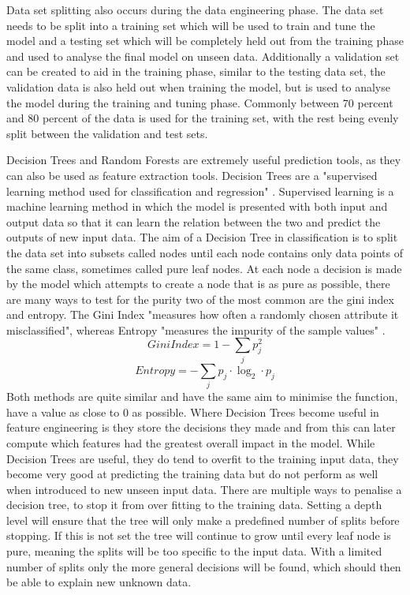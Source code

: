 \documentclass{imc-inf}
\begin{document}
	Data set splitting also occurs during the data engineering phase. The data set needs to be split into a training set which will be used to train and tune the model and a testing set which will be completely held out from the training phase and used to analyse the final model on unseen data. Additionally a validation set can be created to aid in the training phase, similar to the testing data set, the validation data is also held out when training the model, but is used to analyse the model during the training and tuning phase. Commonly between 70 percent and 80 percent of the data is used for the training set, with the rest being evenly split between the validation and test sets. 
	
	Decision Trees and Random Forests are extremely useful prediction tools, as they can also be used as feature extraction tools. Decision Trees are a "supervised learning method used for classification and regression" \cite{website:SciKitTrees}. Supervised learning is a machine learning method in which the model is presented with both input and output data so that it can learn the relation between the two and predict the outputs of new input data. The aim of a Decision Tree in classification is to split the data set into subsets called nodes until each node contains only data points of the same class, sometimes called pure leaf nodes. At each node a decision is made by the model which attempts to create a node that is as pure as possible, there are many ways to test for the purity two of the most common are the gini index and entropy. The Gini Index "measures how often a randomly chosen attribute it misclassified", whereas Entropy "measures the impurity of the sample values" \cite{website:IBM_Trees}. 
	\begin{equation}
	GiniIndex = 1-\sum_{j}p_{j}^{2}
	\end{equation}
	\begin{equation}
	Entropy = -\sum_{j}p_{j}\cdot \log_{2}\cdot p_{j}
	\end{equation}
 	Both methods are quite similar and have the same aim to minimise the function, have a value as close to 0 as possible.
 	Where Decision Trees become useful in feature engineering is they store the decisions they made and from this can later compute which features had the greatest overall impact in the model. 
 	While Decision Trees are useful, they do tend to overfit to the training input data, they become very good at predicting the training data but do not perform as well when introduced to new unseen input data. There are multiple ways to penalise a decision tree, to stop it from over fitting to the training data. 
 	Setting a depth level will ensure that the tree will only make a predefined number of splits before stopping. If this is not set the tree will continue to grow until every leaf node is pure, meaning the splits will be too specific to the input data. With a limited number of splits only the more general decisions will be found, which should then be able to explain new unknown data. 
 
\end{document}
